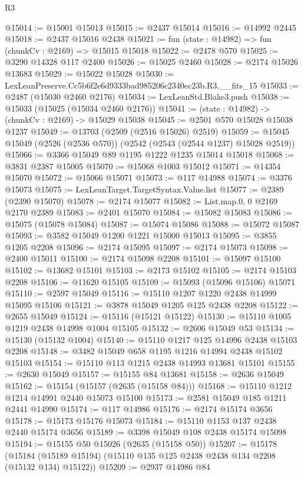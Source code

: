 \begin{lexlean}{R3}
\begin{coremodule}
@15014 := @15001 @15013
@15015 := @2437 @15014
@15016 := @14992 @2445
@15018 := @2437 @15016 @2438
@15021 := fun (state : @14982) => fun (chunkCv : @2169) => @15015 @15018
@15022 := @2478 @570
@15025 := @3290 @14328 @117 @2400
@15026 := @15025 @2460
@15028 := @2174 @15026 @13683
@15029 := @15022 @15028
@15030 := LexLeanPreserve.Cc5b6f2e6d9333bad985206c2340ec23b.R3.__fits_15
@15033 := @2487 (@15030 @2460 @2176)
@15034 := LexLeanStd.Blake3.push
@15038 := @15033 (@15025 (@15034 @2460 @2176))
@15041 := (state : @14982) -> (chunkCv : @2169) -> @15029 @15038
@15045 := @2501 @570 @15028 @15038 @1237
@15049 := @13703 (@2509 (@2516 @15026) @2519)
@15059 := @15045 @15049 (@2526 (@2536 @570)) (@2542 (@2543 (@2544 @1237) @15028 @2519))
@15066 := @3366 @15049 @89 @1195 @1222 @1235 @15014 @15018
@15068 := @3831 @2387 @15005
@15070 := @15068 @1003 @15012
@15071 := @14354 @15070
@15072 := @15066 @15071
@15073 := @117 @14988
@15074 := @3376 @15073
@15075 := LexLeanTarget.TargetSyntax.Value.list
@15077 := @2389 (@2390 @15070)
@15078 := @2174 @15077
@15082 := List.map.{0, 0} @2169 @2170 @2389
@15083 := @2401 @15070
@15084 := @15082 @15083
@15086 := @15075 (@15078 @15084)
@15087 := @15074 @15086
@15088 := @15072 @15087
@15093 := @3582 @15049 @1200 @1221 @15000 @15013
@15095 := @3855 @1205 @2208
@15096 := @2174 @15095
@15097 := @2174 @15073
@15098 := @2400 @15011
@15100 := @2174 @15098 @2208
@15101 := @15097 @15100
@15102 := @13682 @15101
@15103 := @2173 @15102
@15105 := @2174 @15103 @2208
@15106 := @11620 @15105
@15109 := @15093 (@15096 @15106) @15071
@15110 := @2597 @15049
@15116 := @15110 @1207 @1220 @2438 @14999 @15095 @15106
@15121 := @3878 @15049 @1205 @125 @2438 @2208
@15122 := @2655 @15049
@15124 := @15116 (@15121 @15122)
@15130 := @15110 @1005 @1219 @2438 @14998 @1004 @15105
@15132 := @2606 @15049 @53
@15134 := @15130 (@15132 @1004)
@15140 := @15110 @1217 @125 @14996 @2438 @15103 @2208
@15148 := @3482 @15049 @658 @1195 @1216 @14994 @2438 @15102 @15103
@15154 := @15110 @113 @1215 @2438 @14993 @13681 @15101
@15155 := @2630 @15049
@15157 := @15155 @84 @13681
@15158 := @2636 @15049
@15162 := @15154 (@15157 (@2635 (@15158 @84)))
@15168 := @15110 @1212 @1214 @14991 @2440 @15073 @15100
@15173 := @2581 @15049 @185 @1211 @2441 @14990
@15174 := @117 @14986
@15176 := @2174 @15174 @3656
@15178 := @15173 @15176 @15073
@15184 := @15110 @1153 @137 @2438 @2440 @15174 @3656
@15189 := @3398 @15049 @108 @2438 @15174 @15098
@15194 := @15155 @50 @15026 (@2635 (@15158 @50))
@15207 := @15178
    (@15184 (@15189 @15194) (@15110 @135 @125 @2438 @2438 @134 @2208 (@15132 @134) @15122))
@15209 := @2937 @14986 @84

\end{coremodule}
\end{lexlean}
